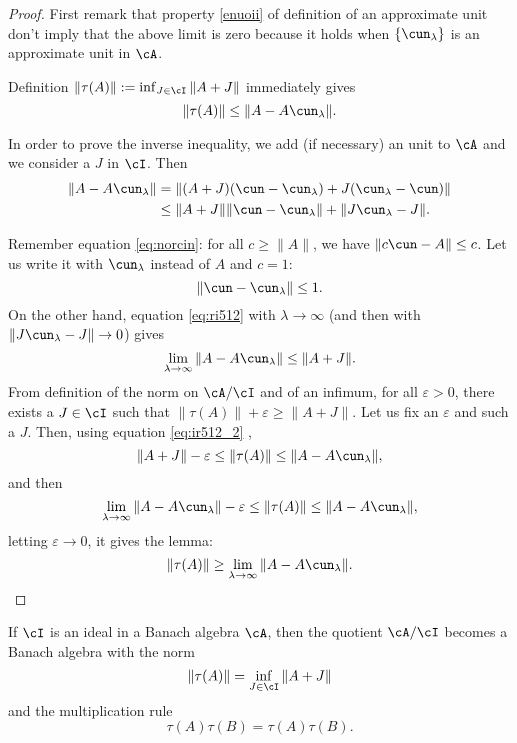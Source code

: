 \begin{proof}
First remark that property \ref{enuoii} of definition of an approximate unit don't imply that the above limit is zero because it holds when $\{ \cun_{\lambda} \}$ is an approximate unit in $\cA$. 

Definition $\| \tau(A) \|:=\inf_{J\in\cI}\| A+J \|$ immediately gives
\begin{equation} \label{eq:ir512_2}
  \|\tau(A)\|\leq \| A-A\cun_{\lambda} \|.
\end{equation}

In order to prove the inverse inequality, we add (if necessary) an unit to $\cA$ and we consider a $J$ in $\cI$. Then
\begin{equation} \label{eq:ri512}
\begin{split}
  \| A-A\cun_{\lambda} \|&=\| (A+J)(\cun-\cun_{\lambda})+J(\cun_{\lambda}-\cun) \|\\
                         &\leq \| A+J \|\| \cun-\cun_{\lambda} \|+\| J\cun_{\lambda}-J \|.
\end{split}
\end{equation}

Remember equation \eqref{eq:norcin}: for all $c\geq \| A \|$, we have $\| c\cun-A \|\leq c$. Let us write it  with $\cun_{\lambda}$ instead of $A$ and $c=1$:
\[ 
  \| \cun-\cun_{\lambda} \|\leq 1.
\]
On the other hand, equation \eqref{eq:ri512} with $\lambda\to\infty$ (and then with $\| J\cun_{\lambda}-J \|\to 0$) gives
\[ 
  \lim_{\lambda\to\infty}\| A-A\cun_{\lambda} \|\leq\| A+J \|.
\]
From definition of the norm on $\cA/\cI$ and of an infimum, for all $\varepsilon>0$, there exists a $J\in \cI$ such that $\| \tau(A) \|+\varepsilon\geq\| A+J \|$. Let us fix an $\varepsilon$ and such a $J$. Then, using equation \eqref{eq:ir512_2} , 
\[ 
  \| A+J \|-\varepsilon\leq\| \tau(A) \|\leq\| A-A\cun_{\lambda} \|,
\]
 and then
\[ 
  \lim_{\lambda\to\infty}\| A-A\cun_{\lambda} \|-\varepsilon \leq\| \tau(A) \|\leq\| A-A\cun_{\lambda} \|,
\]
letting $\varepsilon\to 0$, it gives the lemma:
\[ 
  \| \tau(A) \|\geq \lim_{\lambda\to\infty}\| A-A\cun_{\lambda} \|.
\]
\end{proof}

\begin{proposition} \label{prop:ideal_Banach}
If $\cI$ is an ideal in a Banach algebra $\cA$, then the quotient $\cA/\cI$ becomes a Banach algebra with the norm
\begin{equation}  \label{eq:norm_ideal}
\|\tau(A)\|=\inf_{J\in\cI}\|A+J\|
\end{equation}
and the multiplication rule
\begin{equation}   \label{eq:prod_ideal}
\tau(A)\tau(B)=\tau(A)\tau(B).
\end{equation}
\end{proposition}

